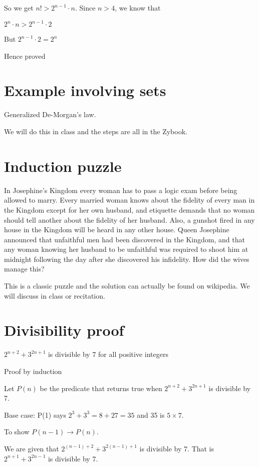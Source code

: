 \documentclass[12pt]{article}
\begin{document}
So we get $n! > 2^{n-1} \cdot n$. Since $n >4$, we know that 

$2^n \cdot n > 2^{n-1} \cdot 2$ 

But $2^{n-1} \cdot 2 = 2^n$

Hence proved

\section*{Example involving sets}

Generalized De-Morgan's law.

We will do this in class and the steps are all in the Zybook.

\section*{Induction puzzle}

 In Josephine's Kingdom every woman has to pass a logic exam before being allowed to marry. Every married woman knows about the fidelity of every man in the Kingdom except for her own husband, and etiquette demands that no woman should tell another about the fidelity of her husband. Also, a gunshot fired in any house in the Kingdom will be heard in any other house. Queen Josephine announced that unfaithful men had been discovered in the Kingdom, and that any woman knowing her husband to be unfaithful was required to shoot him at midnight following the day after she discovered his infidelity. How did the wives manage this?
 
This is a classic puzzle and the solution can actually be found on wikipedia. We will discuss in class or recitation.

\section*{Divisibility proof}

$2^{n+2} + 3^{2n+1}$ is divisible by 7 for all positive integers

Proof by induction

Let $P(n)$ be the predicate that returns true when $2^{n+2} + 3^{2n+1}$ is divisible by 7.

Base case: P(1) says $2^3 + 3^3 = 8 + 27 = 35$ and 35 is $5 \times 7$.

To show $P(n-1) \rightarrow P(n)$.

We are given that $2^{(n-1) + 2} + 3^{2(n-1)+1}$ is divisible by 7. That is $2^{n+1} + 3^{2n-1}$ is divisible by 7.
\end{document}
